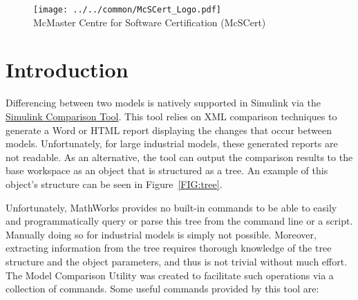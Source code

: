\documentclass{article}
\title{\ToolName}
\date{\monthyeardate\today}
\makeatletter
\newcommand{\ToolName}{Model Comparison Utility\@\xspace}
\newcommand{\EditsObj}{\keyword{xmlcomp.Edits}\@\xspace}
\makeatother
\begin{document}
\maketitle
\vfill

\begin{figure}
	\centering
	\texttt{[image: ../../common/McSCert\_Logo.pdf]} \\
	McMaster Centre for Software Certification (McSCert)
\end{figure}

\newpage


\tableofcontents
\newpage

\section{Introduction}

Differencing between two models is natively supported in Simulink via the \href{https://www.mathworks.com/help/simulink/model-comparison.html}{Simulink Comparison Tool}. This tool relies on XML comparison techniques to generate a Word or HTML report displaying the changes that occur between models. Unfortunately, for large industrial models, these generated reports are not readable. As an alternative, the tool can output the comparison results to the \Matlab base workspace as an \EditsObj object that is structured as a tree. An example of this object's structure can be seen in Figure~\ref{FIG:tree}.

Unfortunately, MathWorks provides no built-in commands to be able to easily and programmatically query or parse this tree from the command line or a script. Manually doing so for industrial models is simply not possible. Moreover, extracting information from the tree requires thorough knowledge of the tree structure and the object parameters, and thus is not trivial without much effort. The \ToolName was created to facilitate such operations via a collection of commands. Some useful commands provided by this tool are:
\end{document}
